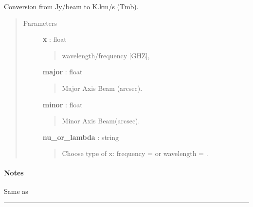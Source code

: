 \documentclass[a4paper,10pt,english]{sphinxmanual}
\begin{document}
\begin{fulllineitems}
\label{functions:astrolyze.functions.units.jansky_to_kelvin}
Conversion from Jy/beam to K.km/s (Tmb).
\begin{quote}\begin{description}
\item[{Parameters }] \leavevmode
\textbf{x} : float
\begin{quote}

wavelength/frequency {[}GHZ{]},
\end{quote}

\textbf{major} : float
\begin{quote}

Major Axis Beam (arcsec).
\end{quote}

\textbf{minor} : float
\begin{quote}

Minor Axis Beam(arcsec).
\end{quote}

\textbf{nu\_or\_lambda} : string
\begin{quote}

Choose type of x: frequency =  or wavelength = .
\end{quote}

\end{description}\end{quote}
\paragraph{Notes}

Same as {\hyperref[functions:astrolyze.functions.units.kelvin_to_jansky]{}}

\end{fulllineitems}



\bigskip\hrule{}\bigskip
\end{document}
